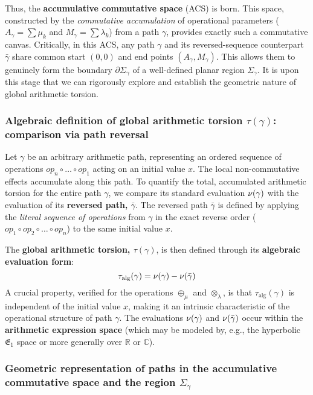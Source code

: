Thus, the \textbf{accumulative commutative space} (ACS) is born. This space, constructed by the \textit{commutative accumulation} of operational parameters ($A_\gamma = \sum \mu_k$ and $M_\gamma = \sum \lambda_k$) from a path $\gamma$, provides exactly such a commutative canvas. Critically, in this ACS, any path $\gamma$ and its reversed-sequence counterpart $\bar{\gamma}$ share common start $(0,0)$ and end points $(A_\gamma, M_\gamma)$. This allows them to genuinely form the boundary $\partial\Sigma_\gamma$ of a well-defined planar region $\Sigma_\gamma$. It is upon this stage that we can rigorously explore and establish the geometric nature of global arithmetic torsion.

\subsubsection*{Algebraic definition of global arithmetic torsion $\tau(\gamma)$: comparison via path reversal}

Let $\gamma$ be an arbitrary arithmetic path, representing an ordered sequence of operations $op_n \circ \dots \circ op_1$ acting on an initial value $x$. The local non-commutative effects accumulate along this path. To quantify the total, accumulated arithmetic torsion for the entire path $\gamma$, we compare its standard evaluation $\nu(\gamma)$ with the evaluation of its \textbf{reversed path, $\bar{\gamma}$}. The reversed path $\bar{\gamma}$ is defined by applying the \textit{literal sequence of operations} from $\gamma$ in the exact reverse order ($op_1 \circ op_2 \circ \dots \circ op_n$) to the same initial value $x$.

The \textbf{global arithmetic torsion, $\tau(\gamma)$}, is then defined through its \textbf{algebraic evaluation form}:
\begin{equation}
\tau_{\text{alg}}(\gamma) = \nu(\gamma) - \nu(\bar{\gamma})
\label{eq:T_alg_formal_final_narrative_enhanced_acs_AM_lc}
\end{equation}
A crucial property, verified for the operations $\oplus_\mu$ and $\otimes_\lambda$, is that $\tau_{\text{alg}}(\gamma)$ is independent of the initial value $x$, making it an intrinsic characteristic of the operational structure of path $\gamma$. The evaluations $\nu(\gamma)$ and $\nu(\bar{\gamma})$ occur within the \textbf{arithmetic expression space} (which may be modeled by, e.g., the hyperbolic $\mathfrak{E}_1$ space or more generally over $\mathbb{R}$ or $\mathbb{C}$).

\subsubsection*{Geometric representation of paths in the accumulative commutative space and the region $\Sigma_\gamma$}

